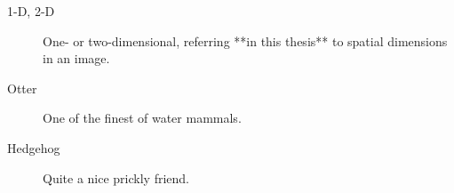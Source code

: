 \begin{description}
\item[1-D, 2-D] One- or two-dimensional, referring **in this thesis** to spatial dimensions in an image.
\item[Otter] One of the finest of water mammals.
\item[Hedgehog] Quite a nice prickly friend.
\end{description}